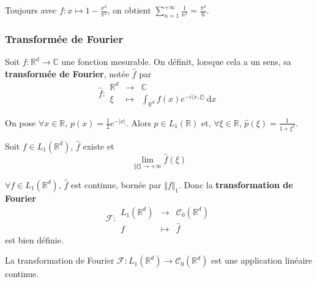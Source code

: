   \begin{example}
    Toujours avec $f : x \mapsto 1 - \frac{x^2}{\pi^2}$, on obtient $\sum_{n=1}^{+\infty} \frac{1}{n^2} = \frac{\pi^2}{6}$.
  \end{example}

  \subsubsection{Transformée de Fourier}


  \begin{definition}
    Soit $f : \mathbb{R}^d \rightarrow \mathbb{C}$ une fonction mesurable. On définit, lorsque cela a un sens, sa \textbf{transformée de Fourier}, notée $\widehat{f}$ par
    \[
    \widehat{f} :
    \begin{array}{ccc}
      \mathbb{R}^d &\rightarrow& \mathbb{C} \\
      \xi &\mapsto& \int_{\mathbb{R}^d} f(x) e^{-i \langle x, \xi \rangle} \, \mathrm{d}x
    \end{array}
    \]
  \end{definition}

  \begin{example}
    On pose $\forall x \in \mathbb{R}$, $p(x) = \frac{1}{2} e^{-|x|}$. Alors $p \in L_1(\mathbb{R})$ et, $\forall \xi \in \mathbb{R}$, $\widehat{p}(\xi) = \frac{1}{1+\xi^2}$.
  \end{example}

  \begin{lemma}
    Soit $f \in L_1(\mathbb{R}^d)$, $\widehat{f}$ existe et
    \[ \lim_{\Vert \xi \Vert \rightarrow +\infty} \widehat{f}(\xi) \]
  \end{lemma}

  \begin{theorem}
    $\forall f \in L_1(\mathbb{R}^d)$, $\widehat{f}$ est continue, bornée par $\Vert f \Vert_1$. Donc la \textbf{transformation de Fourier}
    \[
    \mathcal{F} :
    \begin{array}{ccc}
      L_1(\mathbb{R}^d) &\rightarrow& \mathcal{C}_0(\mathbb{R}^d) \\
      f &\mapsto& \widehat{f}
    \end{array}
    \]
    est bien définie.
  \end{theorem}

  \begin{corollary}
    La transformation de Fourier $\mathcal{F} : L_1(\mathbb{R}^d) \rightarrow \mathcal{C}_0(\mathbb{R}^d)$ est une application linéaire continue.
  \end{corollary}

